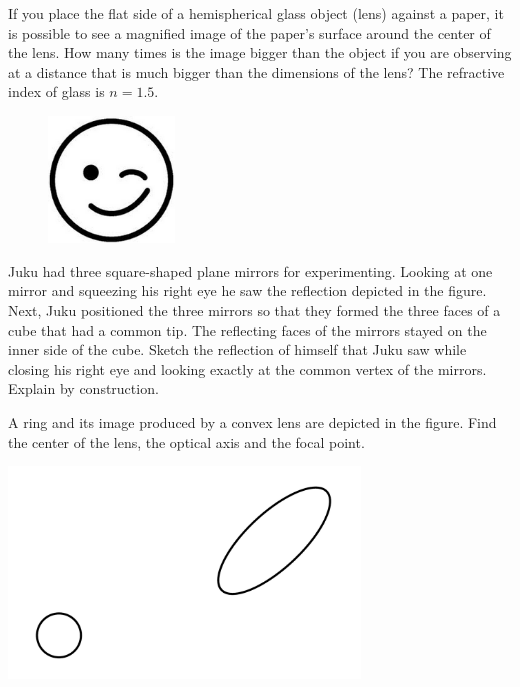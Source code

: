 \documentclass[11pt]{article}
\begin{document}

\probeng
If you place the flat side of a hemispherical glass object (lens) against a paper, it is possible to see a magnified image of the paper’s surface around the center of the lens. How many times is the image bigger than the object if you are observing at a distance that is much bigger than the dimensions of the lens? The refractive index of glass is $n=\num{1.5}$.
\probend
\bigskip


\probeng
\begin{figure}
	\vspace{-25pt}
	\begin{center}
		\includegraphics[width=0.3\textwidth]{2016-v3g-08-wink}
	\end{center}
	\vspace{-20pt}
\end{figure}
Juku had three square-shaped plane mirrors for experimenting. Looking at one mirror and squeezing his right eye he saw the reflection depicted in the figure. Next, Juku positioned the three mirrors so that they formed the three faces of a cube that had a common tip. The reflecting faces of the mirrors stayed on the inner side of the cube. Sketch the reflection of himself that Juku saw while closing his right eye and looking exactly at the common vertex of the mirrors. Explain by construction.
\probend
\bigskip


\probeng
A ring and its image produced by a convex lens are depicted in the figure. Find the center of the lens, the optical axis and the focal point.
\begin{center}
\includegraphics[width=0.7\textwidth]{2015-v3g-07-ringjaellips}%
\end{center}
\probend
\bigskip
\end{document}
